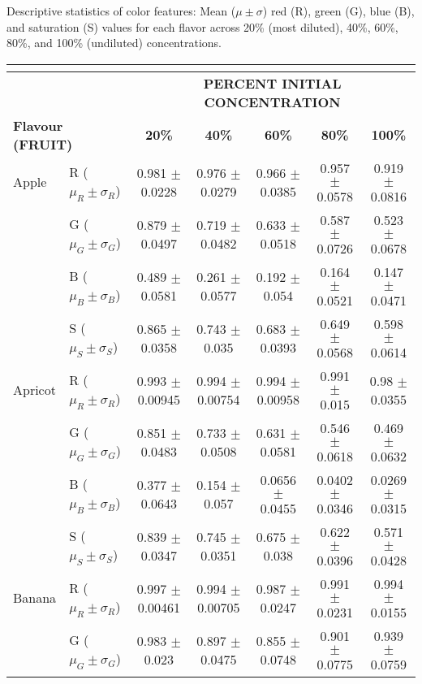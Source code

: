 \documentclass[authoryear]{elsarticle}
\begin{document}
  	\centering
  	\caption{Descriptive statistics of color features: Mean ($\mu \pm \sigma$) red (R), green (G), blue (B), and saturation (S) values for each flavor across 20\% (most diluted), 40\%, 60\%, 80\%, and 100\% (undiluted) concentrations.}
\begin{tabular}{llccccc}
	\multicolumn{7}{c}{}\\ 
	\toprule
    \multicolumn{1}{r}{} & & \multicolumn{5}{c}{\textbf{PERCENT INITIAL CONCENTRATION}} \\
    \midrule
    \multicolumn{2}{l}{\textbf{Flavour (FRUIT)}} & \textbf{20\%} & \textbf{40\%} & \textbf{60\%} & \textbf{80\%} & \textbf{100\%} \\
    \midrule
    Apple 		 & R ($\mu_R \pm \sigma_R$) & 0.981 $\pm$ 0.0228 & 0.976 $\pm$ 0.0279 & 0.966 $\pm$ 0.0385 & 0.957 $\pm$ 0.0578 & 0.919 $\pm$ 0.0816 \\
       			 & G ($\mu_G \pm \sigma_G$) & 0.879 $\pm$ 0.0497 & 0.719 $\pm$ 0.0482 & 0.633 $\pm$ 0.0518 & 0.587 $\pm$ 0.0726 & 0.523 $\pm$ 0.0678 \\
         		 & B ($\mu_B \pm \sigma_B$) & 0.489 $\pm$ 0.0581 & 0.261 $\pm$ 0.0577 & 0.192 $\pm$ 0.054 & 0.164 $\pm$ 0.0521 & 0.147 $\pm$ 0.0471 \\
         		 & S ($\mu_S \pm \sigma_S$) & 0.865 $\pm$ 0.0358 & 0.743 $\pm$ 0.035 & 0.683 $\pm$ 0.0393 & 0.649 $\pm$ 0.0568 & 0.598 $\pm$ 0.0614 \\
	\midrule
	Apricot 	 & R ($\mu_R \pm \sigma_R$) & 0.993 $\pm$ 0.00945 & 0.994 $\pm$ 0.00754 & 0.994 $\pm$ 0.00958 & 0.991 $\pm$ 0.015 & 0.98 $\pm$ 0.0355 \\
    			 & G ($\mu_G \pm \sigma_G$) & 0.851 $\pm$ 0.0483 & 0.733 $\pm$ 0.0508 & 0.631 $\pm$ 0.0581 & 0.546 $\pm$ 0.0618 & 0.469 $\pm$ 0.0632 \\
          		 & B ($\mu_B \pm \sigma_B$) & 0.377 $\pm$ 0.0643 & 0.154 $\pm$ 0.057 & 0.0656 $\pm$ 0.0455 & 0.0402 $\pm$ 0.0346 & 0.0269 $\pm$ 0.0315 \\
          		 & S ($\mu_S \pm \sigma_S$) & 0.839 $\pm$ 0.0347 & 0.745 $\pm$ 0.0351 & 0.675 $\pm$ 0.038 & 0.622 $\pm$ 0.0396 & 0.571 $\pm$ 0.0428 \\
    \midrule
	Banana		 & R ($\mu_R \pm \sigma_R$) & 0.997 $\pm$ 0.00461 & 0.994 $\pm$ 0.00705 & 0.987 $\pm$ 0.0247 & 0.991 $\pm$ 0.0231 & 0.994 $\pm$ 0.0155 \\
         		 & G ($\mu_G \pm \sigma_G$) & 0.983 $\pm$ 0.023 & 0.897 $\pm$ 0.0475 & 0.855 $\pm$ 0.0748 & 0.901 $\pm$ 0.0775 & 0.939 $\pm$ 0.0759 \\

\end{tabular}
\end{document}
